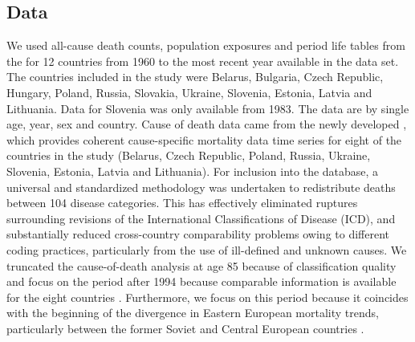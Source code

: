 \documentclass{article}
\begin{document}
\begin{spacing}{1.5}
\subsection*{Data}
We used all-cause death counts, population exposures and period life tables from the \citet{HMD} for 12 countries from 1960 to the most recent year available in the data set. The countries included in the study were Belarus, Bulgaria, Czech Republic, Hungary, Poland, Russia, Slovakia, Ukraine, Slovenia, Estonia, Latvia and Lithuania. Data for Slovenia was only available from 1983. The data are by single age, year, sex and country.
Cause of death data came from the newly developed \citet{HcO}, which provides coherent cause-specific mortality data time series for eight of the countries in the study (Belarus, Czech Republic, Poland, Russia, Ukraine, Slovenia, Estonia, Latvia and Lithuania). For inclusion into the database, a universal and standardized methodology was undertaken to redistribute deaths between 104 disease categories. This has effectively eliminated ruptures surrounding revisions of the International Classifications of Disease (ICD), and substantially reduced cross-country comparability problems owing to different coding practices, particularly from the use of ill-defined and unknown causes. We truncated the cause-of-death analysis at age 85 because of classification quality and focus on the period after 1994 because comparable information is available for the eight countries \citep{HcO}. Furthermore, we focus on this period because it coincides with the beginning of the divergence in Eastern European mortality trends, particularly between the former Soviet and Central European countries \citep{mesle2004mortality}.\\


\end{spacing}
\end{document}
